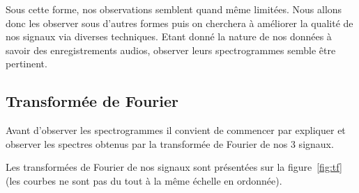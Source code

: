 Sous cette forme, nos observations semblent quand même limitées.
Nous allons donc les observer sous d'autres formes puis on cherchera à améliorer la qualité de nos signaux via diverses techniques. Etant donné la nature de nos données à savoir des enregistrements audios, observer leurs spectrogrammes semble être pertinent.

\hypertarget{Transformuxe9-de-Fourier}{%
\subsection{Transformée de Fourier}
\label{Transformuxe9-de-Fourier}}

Avant d'observer les spectrogrammes il convient de commencer par expliquer et observer les spectres obtenus par la transformée de Fourier de nos 3 signaux.

Les transformées de Fourier de nos signaux sont présentées sur la figure~\ref{fig:tf} (les courbes ne sont pas du tout à la même échelle en ordonnée).

